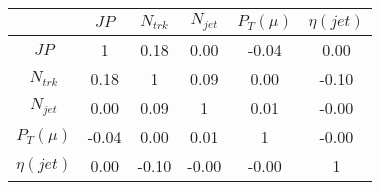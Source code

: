 \begin{tabular}{|c|c|c|c|c|c|} 
\hline
 & $JP$ & $N_{trk}$ & $N_{jet}$ & $P_{T} (\mu)$ & $\eta (jet)$ \\ \hline
$JP$ & 1 & 0.18 & 0.00 & -0.04 & 0.00 \\
$N_{trk}$ & 0.18 & 1 & 0.09 & 0.00 & -0.10 \\
$N_{jet}$ & 0.00 & 0.09 & 1 & 0.01 & -0.00 \\
$P_{T} (\mu)$ & -0.04 & 0.00 & 0.01 & 1 & -0.00 \\
$\eta (jet)$ & 0.00 & -0.10 & -0.00 & -0.00 & 1 \\
\hline 
\end{tabular} 


